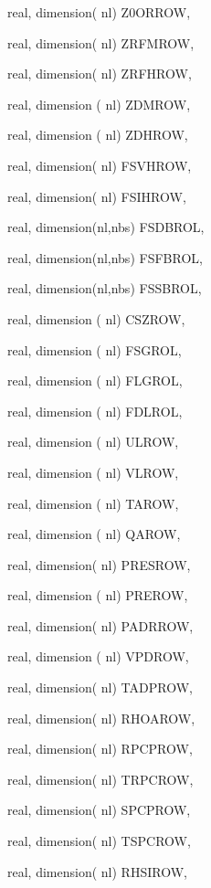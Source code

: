 {\begin{DoxyParamCaption}
\item[{real, dimension( nl)}]{Z0\+O\+R\+R\+O\+W, }
\item[{real, dimension( nl)}]{Z\+R\+F\+M\+R\+O\+W, }
\item[{real, dimension( nl)}]{Z\+R\+F\+H\+R\+O\+W, }
\item[{real, dimension ( nl)}]{Z\+D\+M\+R\+O\+W, }
\item[{real, dimension ( nl)}]{Z\+D\+H\+R\+O\+W, }
\item[{real, dimension( nl)}]{F\+S\+V\+H\+R\+O\+W, }
\item[{real, dimension( nl)}]{F\+S\+I\+H\+R\+O\+W, }
\item[{real, dimension(nl,nbs)}]{F\+S\+D\+B\+R\+O\+L, }
\item[{real, dimension(nl,nbs)}]{F\+S\+F\+B\+R\+O\+L, }
\item[{real, dimension(nl,nbs)}]{F\+S\+S\+B\+R\+O\+L, }
\item[{real, dimension ( nl)}]{C\+S\+Z\+R\+O\+W, }
\item[{real, dimension ( nl)}]{F\+S\+G\+R\+O\+L, }
\item[{real, dimension ( nl)}]{F\+L\+G\+R\+O\+L, }
\item[{real, dimension ( nl)}]{F\+D\+L\+R\+O\+L, }
\item[{real, dimension  ( nl)}]{U\+L\+R\+O\+W, }
\item[{real, dimension  ( nl)}]{V\+L\+R\+O\+W, }
\item[{real, dimension  ( nl)}]{T\+A\+R\+O\+W, }
\item[{real, dimension  ( nl)}]{Q\+A\+R\+O\+W, }
\item[{real, dimension( nl)}]{P\+R\+E\+S\+R\+O\+W, }
\item[{real, dimension ( nl)}]{P\+R\+E\+R\+O\+W, }
\item[{real, dimension( nl)}]{P\+A\+D\+R\+R\+O\+W, }
\item[{real, dimension ( nl)}]{V\+P\+D\+R\+O\+W, }
\item[{real, dimension( nl)}]{T\+A\+D\+P\+R\+O\+W, }
\item[{real, dimension( nl)}]{R\+H\+O\+A\+R\+O\+W, }
\item[{real, dimension( nl)}]{R\+P\+C\+P\+R\+O\+W, }
\item[{real, dimension( nl)}]{T\+R\+P\+C\+R\+O\+W, }
\item[{real, dimension( nl)}]{S\+P\+C\+P\+R\+O\+W, }
\item[{real, dimension( nl)}]{T\+S\+P\+C\+R\+O\+W, }
\item[{real, dimension( nl)}]{R\+H\+S\+I\+R\+O\+W, }

\end{DoxyParamCaption}}
